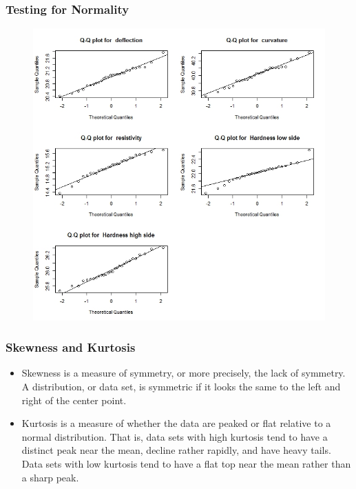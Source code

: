 \documentclass{beamer}
\begin{document}
\begin{frame}[fragile]
\frametitle{Testing for Normality}
\begin{figure}[h!]
\centering
\includegraphics[width=0.8\linewidth]{images/MSQC-bimetal1qq}
\end{figure}
\end{frame}
\begin{frame}
	\frametitle{Skewness and Kurtosis}
\begin{itemize}
\item Skewness is a measure of symmetry, or more precisely, the lack of symmetry. A distribution, or data set, is symmetric if it looks the same to the left and right of the center point.

\item Kurtosis is a measure of whether the data are peaked or flat relative to a normal distribution. That is, data sets with high kurtosis tend to have a distinct peak near the mean, decline rather rapidly, and have heavy tails. Data sets with low kurtosis tend to have a flat top near the mean rather than a sharp peak.
\end{itemize}
\end{frame}
\end{document}
